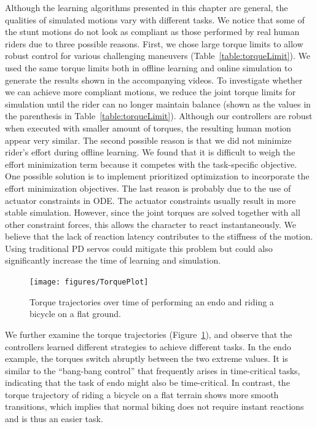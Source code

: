 Although the learning algorithms presented in this chapter are general, the qualities of simulated motions vary with different tasks. We notice that some of the stunt motions do not look as compliant as those performed by real human riders due to three possible reasons. First, we chose large torque limits to allow robust control for various challenging maneuvers (Table~\ref{table:torqueLimit}). We used the same torque limits both in offline learning and online simulation to generate the results shown in the accompanying videos. To investigate whether we can achieve more compliant motions, we reduce the joint torque limits for simulation until the rider can no longer maintain balance (shown as the values in the parenthesis in Table~\ref{table:torqueLimit}). Although our controllers are robust when executed with smaller amount of torques, the resulting human motion appear very similar. The second possible reason is that we did not minimize rider's effort during offline learning. We found that it is difficult to weigh the effort minimization term because it competes with the task-specific objective. One possible solution is to implement prioritized optimization \cite{delasa:2009} to incorporate the effort minimization objectives. The last reason is probably due to the use of actuator constraints in ODE. The actuator constraints usually result in more stable simulation. However, since the joint torques are solved together with all other constraint forces, this allows the character to react instantaneously. We believe that the lack of reaction latency contributes to the stiffness of the motion. Using traditional PD servos could mitigate this problem but could also significantly increase the time of learning and simulation.

\begin{figure}[ht]
  \centering
  \texttt{[image: figures/TorquePlot]}
  \caption{Torque trajectories over time of performing an endo and riding a bicycle on a flat ground. }
  \label{fig:torquePlot}
\end{figure}

We further examine the torque trajectories (Figure~\ref{fig:torquePlot}), and observe that the controllers learned different strategies to achieve different tasks. In the endo example, the torques switch abruptly between the two extreme values. It is similar to the ``bang-bang control'' that frequently arises in time-critical tasks, indicating that the task of endo might also be time-critical. In contrast, the torque trajectory of riding a bicycle on a flat terrain shows more smooth transitions, which implies that normal biking does not require instant reactions and is thus an easier task.

